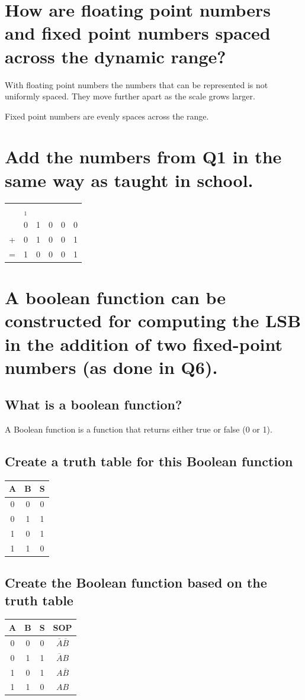 \documentclass{article}
\begin{document}
\section{How are floating point numbers and fixed point numbers spaced
  across the dynamic range?}
With floating point numbers the numbers that can be represented is not
uniformly spaced. They move further apart as the scale grows larger.

Fixed point numbers are evenly spaces across the range.

\section{Add the numbers from Q1 in the same way as taught in
  school.}
\begin{tabular}{c@{\,}c@{\,}c@{\,}c@{\,}c@{\,}c@{\,}}
  & $_1$\\
  & 0 & 1 & 0 & 0 & 0 \\
  + & 0 & 1 & 0 & 0 & 1 \\
  \hline
  = & 1 & 0 & 0 & 0 & 1 \\
  \hline\hline
\end{tabular}

\section{A boolean function can be constructed for computing the LSB
  in the addition of two fixed-point numbers (as done in Q6).}
\subsection{What is a boolean function?}
A Boolean function is a function that returns either true or false (0
or 1).

\subsection{Create a truth table for this Boolean function}
\begin{tabular}{c | c | c}
  A & B & S \\ \hline
  0 & 0 & 0 \\
  0 & 1 & 1 \\
  1 & 0 & 1 \\
  1 & 1 & 0 \\
\end{tabular}

\subsection{Create the Boolean function based on the truth table}
\begin{tabular}{c | c | c | c}
  A & B & S & SOP                        \\ \hline \rule{0pt}{4ex}
  0 & 0 & 0 & $\overline{A}\overline{B}$ \\
  0 & 1 & 1 & $\overline{A}B$            \\
  1 & 0 & 1 & $A\overline{B}$            \\
  1 & 1 & 0 & $AB$                       \\
\end{tabular}
\end{document}
